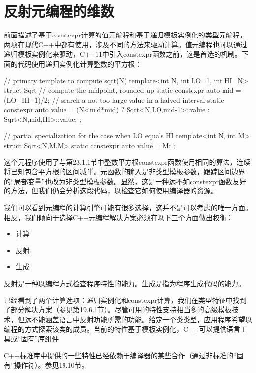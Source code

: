 \section{反射元编程的维数}
前面描述了基于constexpr计算的值元编程和基于递归模板实例化的类型元编程，两项在现代C++中都有使用，涉及不同的方法来驱动计算。值元编程也可以通过递归模板实例化来驱动，C++11中引入constexpr函数之前，这是首选的机制。下面的代码使用递归实例化计算整数的平方根：

\begin{cpp}
// primary template to compute sqrt(N)
template<int N, int LO=1, int HI=N>
struct Sqrt {
	// compute the midpoint, rounded up
	static constexpr auto mid = (LO+HI+1)/2;
	// search a not too large value in a halved interval
	static constexpr auto value = (N<mid*mid) ? Sqrt<N,LO,mid-1>::value
	: Sqrt<N,mid,HI>::value;
};

// partial specialization for the case when LO equals HI
template<int N, int M>
struct Sqrt<N,M,M> {
	static constexpr auto value = M;
};
\end{cpp}

这个元程序使用了与第23.1.1节中整数平方根constexpr函数使用相同的算法，连续将已知包含平方根的区间减半。元函数的输入是非类型模板参数，跟踪区间边界的“局部变量”也改为非类型模板参数。显然，这是一种远不如constexpr函数友好的方法，但我们仍会分析这段代码，以检查它如何使用编译器的资源。

我们可以看到元编程的计算引擎可能有很多选择，这并不是可以考虑的唯一方面。相反，我们倾向于选择C++元编程解决方案必须在以下三个方面做出权衡：

\begin{itemize}
\item 
计算

\item 
反射

\item 
生成
\end{itemize}

反射是一种以编程方式检查程序特性的能力。生成是指为程序生成代码的能力。

已经看到了两个计算选项：递归实例化和constexpr计算，我们在类型特征中找到了部分解决方案（参见第19.6.1节）。尽管可用的特性支持相当多的高级模板技术，但远不能涵盖语言中反射功能所需的功能。给定一个类类型，应用程序希望以编程的方式探索该类的成员。当前的特性基于模板实例化，C++可以提供语言工具或“固有”库组件

\begin{notice}
C++标准库中提供的一些特性已经依赖于编译器的某些合作（通过非标准的“固有”操作符）。参见19.10节。
\end{notice}


